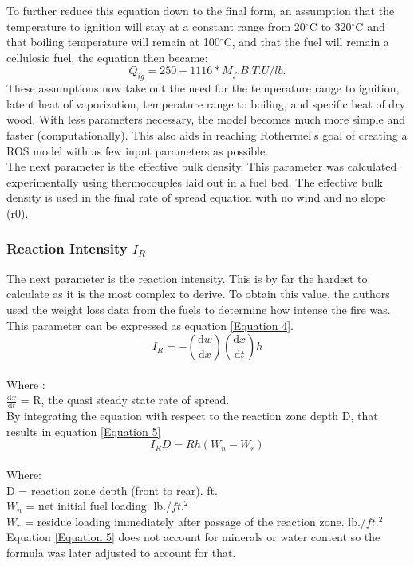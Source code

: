 \documentclass{article}
\begin{document}
To further reduce this equation down to the final form, an assumption that the temperature to ignition will stay at a constant range from 20$^{\circ}$C to 320$^{\circ}$C and that boiling temperature will remain at 100$^{\circ}$C, and that the fuel will remain a cellulosic fuel, the equation then became: 
\begin{equation}
\label{Equation 3}
	Q_{ig} = 250 + 1116 * M_f. B.T.U/lb. 
\end{equation}
\indent These assumptions now take out the need for the temperature range to ignition, latent heat of vaporization, temperature range to boiling, and specific heat of dry wood. With less parameters necessary, the model becomes much more simple and faster (computationally). This also aids in reaching Rothermel's goal of creating a ROS model with as few input parameters as possible. \\
\indent The next parameter is the effective bulk density. This parameter was calculated experimentally using thermocouples laid out in a fuel bed. The effective bulk density is used in the final rate of spread equation with no wind and no slope (r0). \\
\subsubsection{Reaction Intensity $I_R$}
\indent The next parameter is the reaction intensity. This is by far the hardest to calculate as it is the most complex to derive. To obtain this value, the authors used the weight loss data from the fuels to determine how intense the fire was. This parameter can be expressed as equation \ref{Equation 4}.
\begin{equation}
	\label{Equation 4}
	I_R = - (\frac {\mathrm {d}w} {\mathrm{d} x}) (\frac {\mathrm {d}x} {\mathrm{d} t}) h 
\end{equation}\\
Where :\\
$\frac {\mathrm {d}x} {\mathrm{d} t}$ = R, the quasi steady state rate of spread. \\


\indent By integrating the equation with respect to the reaction zone depth D, that results in equation \ref{Equation 5}
\begin{equation}
	\label{Equation 5}
	I_R D = Rh (W_n - W_r)
\end{equation}\\
Where: \\
D = reaction zone depth (front to rear). ft. \\
$W_n$ = net initial fuel loading. lb./$ft. ^ 2$ \\
$W_r$ = residue loading immediately after passage of the reaction zone. lb./$ft. ^ 2$ \\
\indent Equation \ref{Equation 5} does not account for minerals or water content so the formula was later adjusted to account for that. \\
\end{document}

